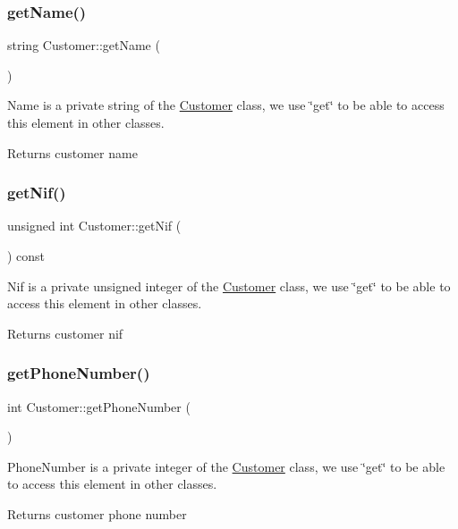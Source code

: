 \subsubsection{\texorpdfstring{get\+Name()}{getName()}}
{\footnotesize\ttfamily string Customer\+::get\+Name (\begin{DoxyParamCaption}{ }\end{DoxyParamCaption})}

Name is a private string of the \hyperlink{classCustomer}{Customer} class, we use \char`\"{}get\char`\"{} to be able to access this element in other classes. \begin{DoxyReturn}{Returns}
customer name 
\end{DoxyReturn}
\hypertarget{classCustomer_a7dfa684a44a1e83f9dfaf0db8df32e14}{}\label{classCustomer_a7dfa684a44a1e83f9dfaf0db8df32e14} 
\subsubsection{\texorpdfstring{get\+Nif()}{getNif()}}
{\footnotesize\ttfamily unsigned int Customer\+::get\+Nif (\begin{DoxyParamCaption}{ }\end{DoxyParamCaption}) const}

Nif is a private unsigned integer of the \hyperlink{classCustomer}{Customer} class, we use \char`\"{}get\char`\"{} to be able to access this element in other classes. \begin{DoxyReturn}{Returns}
customer nif 
\end{DoxyReturn}
\hypertarget{classCustomer_ab64569e18c4b32d8f18f2711a5c124e3}{}\label{classCustomer_ab64569e18c4b32d8f18f2711a5c124e3} 
\subsubsection{\texorpdfstring{get\+Phone\+Number()}{getPhoneNumber()}}
{\footnotesize\ttfamily int Customer\+::get\+Phone\+Number (\begin{DoxyParamCaption}{ }\end{DoxyParamCaption})}

Phone\+Number is a private integer of the \hyperlink{classCustomer}{Customer} class, we use \char`\"{}get\char`\"{} to be able to access this element in other classes. \begin{DoxyReturn}{Returns}
customer phone number 
\end{DoxyReturn}
\hypertarget{classCustomer_a10b0bb2b55a819b80c9e14cb19a7c566}{}\label{classCustomer_a10b0bb2b55a819b80c9e14cb19a7c566} 
